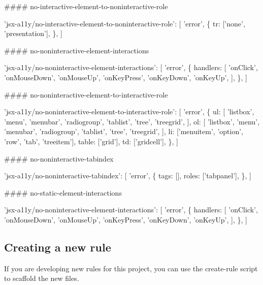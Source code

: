 \#\#\#\# no-\/interactive-\/element-\/to-\/noninteractive-\/role 
\begin{DoxyCode}
'jsx-a11y/no-interactive-element-to-noninteractive-role': [
  'error',
  \{
    tr: ['none', 'presentation'],
  \},
]
\end{DoxyCode}


\#\#\#\# no-\/noninteractive-\/element-\/interactions 
\begin{DoxyCode}
'jsx-a11y/no-noninteractive-element-interactions': [
  'error',
  \{
    handlers: [
      'onClick',
      'onMouseDown',
      'onMouseUp',
      'onKeyPress',
      'onKeyDown',
      'onKeyUp',
    ],
  \},
]
\end{DoxyCode}


\#\#\#\# no-\/noninteractive-\/element-\/to-\/interactive-\/role 
\begin{DoxyCode}
'jsx-a11y/no-noninteractive-element-to-interactive-role': [
  'error',
  \{
    ul: [
      'listbox',
      'menu',
      'menubar',
      'radiogroup',
      'tablist',
      'tree',
      'treegrid',
    ],
    ol: [
      'listbox',
      'menu',
      'menubar',
      'radiogroup',
      'tablist',
      'tree',
      'treegrid',
    ],
    li: ['menuitem', 'option', 'row', 'tab', 'treeitem'],
    table: ['grid'],
    td: ['gridcell'],
  \},
]
\end{DoxyCode}


\#\#\#\# no-\/noninteractive-\/tabindex 
\begin{DoxyCode}
'jsx-a11y/no-noninteractive-tabindex': [
  'error',
  \{
    tags: [],
    roles: ['tabpanel'],
  \},
]
\end{DoxyCode}


\#\#\#\# no-\/static-\/element-\/interactions 
\begin{DoxyCode}
'jsx-a11y/no-noninteractive-element-interactions': [
  'error',
  \{
    handlers: [
      'onClick',
      'onMouseDown',
      'onMouseUp',
      'onKeyPress',
      'onKeyDown',
      'onKeyUp',
    ],
  \},
]
\end{DoxyCode}


\subsection*{Creating a new rule}



If you are developing new rules for this project, you can use the {\ttfamily create-\/rule} script to scaffold the new files.





